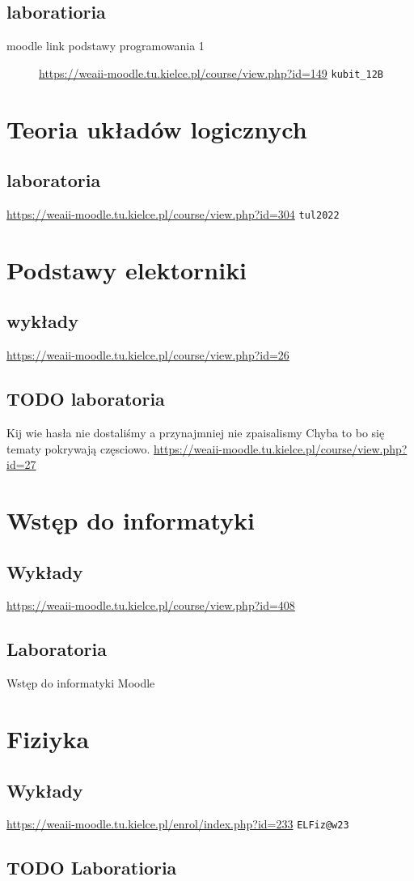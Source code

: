 \documentclass[11pt]{article}
\begin{document}
\subsection{laboratioria}
\label{sec:org8d6653f}
\begin{description}
\item[{moodle link podstawy programowania 1}] \url{https://weaii-moodle.tu.kielce.pl/course/view.php?id=149} \texttt{kubit\_12B}
\end{description}
\section{Teoria układów logicznych}
\label{sec:org1b7133f}
\subsection{laboratoria}
\label{sec:org33a0f56}
\url{https://weaii-moodle.tu.kielce.pl/course/view.php?id=304} \texttt{tul2022}
\section{Podstawy elektorniki}
\label{sec:orga19cfab}
\subsection{wykłady}
\label{sec:orga92dbcd}
\url{https://weaii-moodle.tu.kielce.pl/course/view.php?id=26}
\subsection{{\bfseries\sffamily TODO} laboratoria}
\label{sec:orgeacaadc}
Kij wie hasła nie dostaliśmy a przynajmniej nie zpaisalismy
Chyba to bo się tematy pokrywają częsciowo.
\url{https://weaii-moodle.tu.kielce.pl/course/view.php?id=27}
\section{Wstęp do informatyki}
\label{sec:org1e5b178}
\subsection{Wykłady}
\label{sec:orgba56d29}
\url{https://weaii-moodle.tu.kielce.pl/course/view.php?id=408}
\subsection{Laboratoria}
\label{sec:orgc84dc91}
\begin{description}
\item[{Wstęp do informatyki Moodle}] 
\end{description}
\section{Fiziyka}
\label{sec:org72bf08e}
\subsection{Wykłady}
\label{sec:org50f398d}
\url{https://weaii-moodle.tu.kielce.pl/enrol/index.php?id=233} \texttt{ELFiz@w23}
\subsection{{\bfseries\sffamily TODO} Laboratioria}
\label{sec:org28214bb}
\end{document}
